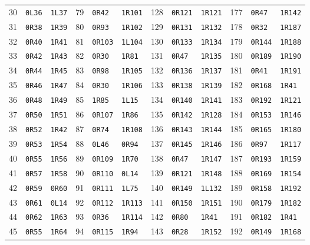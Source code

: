 \begin{center}
\begin{tabular}{@{}rll@{\quad}rll@{\quad}rll@{\quad}rll@{}}
30&\texttt{0L36}&\texttt{1L37}&79&\texttt{0R42}&\texttt{1R101}&128&\texttt{0R121}&\texttt{1R121}&177&\texttt{0R47}&\texttt{1R142}\\
31&\texttt{0R38}&\texttt{1R39}&80&\texttt{0R93}&\texttt{1R102}&129&\texttt{0R131}&\texttt{1R132}&178&\texttt{0R32}&\texttt{1R187}\\
32&\texttt{0R40}&\texttt{1R41}&81&\texttt{0R103}&\texttt{1L104}&130&\texttt{0R133}&\texttt{1R134}&179&\texttt{0R144}&\texttt{1R188}\\
33&\texttt{0R42}&\texttt{1R43}&82&\texttt{0R30}&\texttt{1R81}&131&\texttt{0R47}&\texttt{1R135}&180&\texttt{0R189}&\texttt{1R190}\\
34&\texttt{0R44}&\texttt{1R45}&83&\texttt{0R98}&\texttt{1R105}&132&\texttt{0R136}&\texttt{1R137}&181&\texttt{0R41}&\texttt{1R191}\\
35&\texttt{0R46}&\texttt{1R47}&84&\texttt{0R30}&\texttt{1R106}&133&\texttt{0R138}&\texttt{1R139}&182&\texttt{0R168}&\texttt{1R41}\\
36&\texttt{0R48}&\texttt{1R49}&85&\texttt{1R85}&\texttt{1L15}&134&\texttt{0R140}&\texttt{1R141}&183&\texttt{0R192}&\texttt{1R121}\\
37&\texttt{0R50}&\texttt{1R51}&86&\texttt{0R107}&\texttt{1R86}&135&\texttt{0R142}&\texttt{1R128}&184&\texttt{0R153}&\texttt{1R146}\\
38&\texttt{0R52}&\texttt{1R42}&87&\texttt{0R74}&\texttt{1R108}&136&\texttt{0R143}&\texttt{1R144}&185&\texttt{0R165}&\texttt{1R180}\\
39&\texttt{0R53}&\texttt{1R54}&88&\texttt{0L46}&\texttt{0R94}&137&\texttt{0R145}&\texttt{1R146}&186&\texttt{0R97}&\texttt{1R117}\\
40&\texttt{0R55}&\texttt{1R56}&89&\texttt{0R109}&\texttt{1R70}&138&\texttt{0R47}&\texttt{1R147}&187&\texttt{0R193}&\texttt{1R159}\\
41&\texttt{0R57}&\texttt{1R58}&90&\texttt{0R110}&\texttt{0L14}&139&\texttt{0R121}&\texttt{1R148}&188&\texttt{0R169}&\texttt{1R154}\\
42&\texttt{0R59}&\texttt{0R60}&91&\texttt{0R111}&\texttt{1L75}&140&\texttt{0R149}&\texttt{1L132}&189&\texttt{0R158}&\texttt{1R192}\\
43&\texttt{0R61}&\texttt{0L14}&92&\texttt{0R112}&\texttt{1R113}&141&\texttt{0R150}&\texttt{1R151}&190&\texttt{0R179}&\texttt{1R182}\\
44&\texttt{0R62}&\texttt{1R63}&93&\texttt{0R36}&\texttt{1R114}&142&\texttt{0R80}&\texttt{1R41}&191&\texttt{0R182}&\texttt{1R41}\\
45&\texttt{0R55}&\texttt{1R64}&94&\texttt{0R115}&\texttt{1R94}&143&\texttt{0R28}&\texttt{1R152}&192&\texttt{0R149}&\texttt{1R168}\\

\end{tabular}
\end{center}
